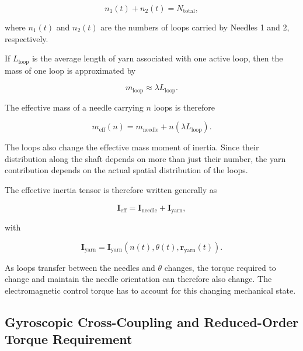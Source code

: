 \documentclass[12pt, a4paper]{article}
\begin{document}
\begin{equation}
n_1(t)+n_2(t)=N_{\text{total}},
\end{equation}

where $n_1(t)$ and $n_2(t)$ are the numbers of loops carried by Needles 1 and 2, respectively.

If $L_{\text{loop}}$ is the average length of yarn associated with one active loop, then the mass of one loop is approximated by

\begin{equation}
m_{\text{loop}}\approx\lambda L_{\text{loop}}.
\end{equation}

The effective mass of a needle carrying $n$ loops is therefore

\begin{equation}
m_{\text{eff}}(n)=
m_{\text{needle}}+
n(\lambda L_{\text{loop}}).
\end{equation}

The loops also change the effective mass moment of inertia. Since their distribution along the shaft depends on more than just their number, the yarn contribution depends on the actual spatial distribution of the loops.

The effective inertia tensor is therefore written generally as

\begin{equation}
\mathbf{I}_{\text{eff}}
=
\mathbf{I}_{\text{needle}}
+
\mathbf{I}_{\text{yarn}},
\end{equation}

with

\begin{equation}
\mathbf{I}_{\text{yarn}}
=
\mathbf{I}_{\text{yarn}}
\left(
n(t),
\theta(t),
\mathbf{r}_{\text{yarn}}(t)
\right).
\end{equation}

As loops transfer between the needles and $\theta$ changes, the torque required to change and maintain the needle orientation can therefore also change. The electromagnetic control torque has to account for this changing mechanical state.

\subsection{Gyroscopic Cross-Coupling and Reduced-Order Torque Requirement}
\end{document}
